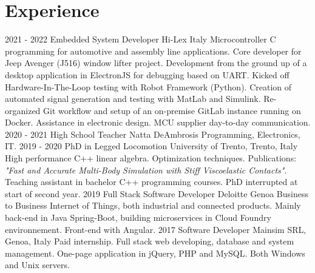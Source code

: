 \documentclass[]{friggeri-cv}
\begin{document}
\section{Experience}
\begin{entrylist}
    \entry
    {2021 - 2022}
    {Embedded System Developer}
    {Hi-Lex Italy}
    {Microcontroller C programming for automotive and assembly line applications.
    Core developer for Jeep Avenger (J516) window lifter project.
    Development from the ground up of a desktop application in ElectronJS for debugging based on UART. Kicked off Hardware-In-The-Loop testing with Robot Framework (Python). Creation of automated signal generation and testing with MatLab and Simulink. Re-organized Git workflow and setup of an on-premise GitLab instance running on Docker. Assistance in electronic design. MCU supplier day-to-day communication.}
  \entry
	{2020 - 2021}
	{High School Teacher}
	{Natta DeAmbrosis}
	{Programming, Electronics, IT.}
  \entry
	{2019 - 2020}
	{PhD in Legged Locomotion}
	{University of Trento, Trento, Italy}
	{High performance C++ linear algebra. Optimization techniques. Publications: \textit{"Fast and Accurate Multi-Body Simulation with Stiff Viscoelastic Contacts"}. Teaching assistant in bachelor C++ programming courses. PhD interrupted at start of second year.}
  \entry
	{2019}
	{Full Stack Software Developer}
	{Deloitte Genoa}
	{Business to Business Internet of Things, both industrial and connected products. Mainly back-end in Java Spring-Boot, building microservices in Cloud Foundry environnement. Front-end with Angular. }
  \entry
    {2017}
    {Software Developer}
    {Mainsim SRL, Genoa, Italy}
    {Paid internship. Full stack web developing, database and system management. One-page application in jQuery, PHP and MySQL. Both Windows and Unix servers.}
\end{entrylist}
\end{document}
